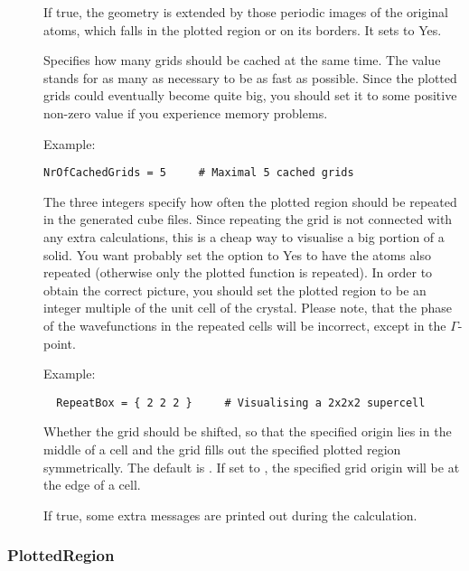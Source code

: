 \begin{description}
\item[] If true, the geometry is extended by those
  periodic images of the original atoms, which falls in the plotted
  region or on its borders.  It sets  to Yes.

\item[] Specifies how many grids should be cached
  at the same time. The value  stands for as many as necessary
  to be as fast as possible. Since the plotted grids could eventually
  become quite big, you should set it to some positive non-zero value
  if you experience memory problems.

Example:
\begin{verbatim}
NrOfCachedGrids = 5     # Maximal 5 cached grids
\end{verbatim}

\item[] The three integers specify how often the plotted
  region should be repeated in the generated cube files. Since
  repeating the grid is not connected with any extra calculations,
  this is a cheap way to visualise a big portion of a solid.  You want
  probably set the  option to Yes to have the
  atoms also repeated (otherwise only the plotted function is
  repeated).  In order to obtain the correct picture, you should set
  the plotted region to be an integer multiple of the unit cell of the
  crystal. Please note, that the phase of the wavefunctions in the
  repeated cells will be incorrect, except in the $\Gamma$-point.

Example:
\begin{verbatim}
  RepeatBox = { 2 2 2 }     # Visualising a 2x2x2 supercell
\end{verbatim}

\item[] Whether the grid should be shifted, so that the specified
  origin lies in the middle of a cell and the grid fills out the specified
  plotted region symmetrically. The default is . If set to , the
  specified grid origin will be at the edge of a cell.

\item[] If true, some extra messages are printed out
  during the calculation. 

\end{description}


\subsubsection{PlottedRegion}
\label{sec:waveplot.PlottedRegion}

